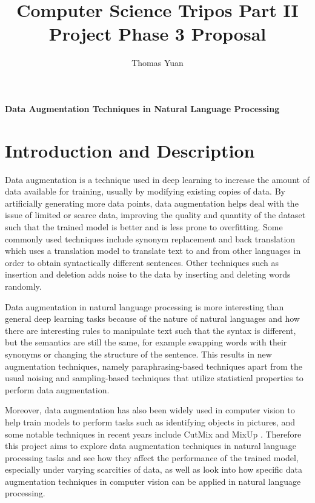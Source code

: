 \documentclass[60pt]{article}
\title{Computer Science Tripos Part II Project Phase 3 Proposal}
\author{Thomas Yuan}
\begin{document}

\maketitle
\begin{center}
\textbf{\Large Data Augmentation Techniques in Natural Language Processing}
\end{center}

\section{Introduction and Description}
\par
Data augmentation is a technique used in deep learning to increase the amount of data available for training, usually by modifying existing copies of data. By artificially generating more data points, data augmentation helps deal with the issue of limited or scarce data, improving the quality and quantity of the dataset such that the trained model is better and is less prone to overfitting. Some commonly used techniques include synonym replacement and back translation which uses a translation model to translate text to and from other languages in order to obtain syntactically different sentences. Other techniques such as insertion and deletion adds noise to the data by inserting and deleting words randomly.
\par
Data augmentation in natural language processing is more interesting than general deep learning tasks because of the nature of natural languages and how there are interesting rules to manipulate text such that the syntax is different, but the semantics are still the same, for example swapping words with their synonyms or changing the structure of the sentence. This results in new augmentation techniques, namely paraphrasing-based techniques apart from the usual noising and sampling-based techniques that utilize statistical properties to perform data augmentation. 
\par
Moreover, data augmentation has also been widely used in computer vision to help train models to perform tasks such as identifying objects in pictures, and some notable techniques in recent years include CutMix \cite{yun2019cutmix} and MixUp \cite{zhang2017mixup}. Therefore this project aims to explore data augmentation techniques in natural language processing tasks and see how they affect the performance of the trained model, especially under varying scarcities of data, as well as look into how specific data augmentation techniques in computer vision can be applied in natural language processing. 
\par
\end{document}
